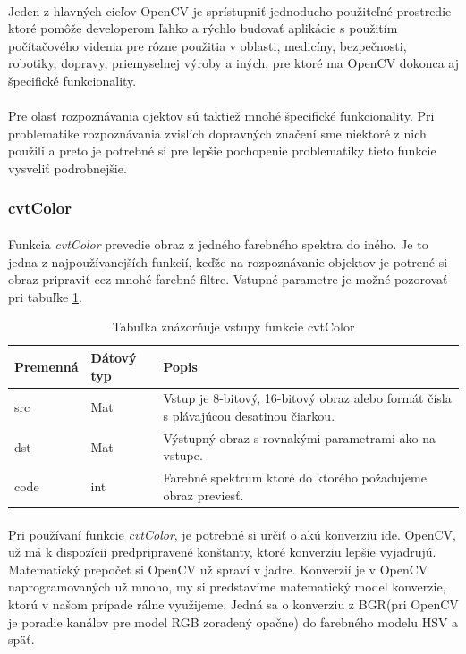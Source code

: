 \documentclass[12pt]{article}
\begin{document}
\paragraph{}
Jeden z hlavných cieľov OpenCV je sprístupniť jednoducho použiteľné prostredie ktoré pomôže developerom ľahko a rýchlo budovať aplikácie s použitím počítačového videnia
pre rôzne použitia v oblasti, medicíny, bezpečnosti, robotiky, dopravy, priemyselnej výroby a iných, pre ktoré ma OpenCV dokonca aj špecifické funkcionality.
\cite{learning_opencv}
\paragraph{}
Pre olasť rozpoznávania ojektov sú taktiež mnohé špecifické funkcionality.
Pri problematike rozpoznávania zvislích dopravných značení sme niektoré z nich použili a preto je potrebné si pre lepšie pochopenie problematiky tieto funkcie vysveliť podrobnejšie.
\subsubsection{cvtColor}
\paragraph{}
Funkcia \emph{cvtColor} prevedie obraz z jedného farebného spektra do iného. Je to jedna z najpoužívanejších funkcií, keďže na rozpoznávanie objektov je potrené si obraz pripraviť
cez mnohé farebné filtre. Vstupné parametre je možné pozorovať pri tabuľke \ref{cvtColorPar}.
\cite{OpenCVDoc}
\begin{table}
	\centering
    \begin{tabular}{ | l | l | p{5cm} |}
    \hline
    Premenná & Dátový typ & Popis \\ \hline
    src & Mat & Vstup je 8-bitový, 16-bitový obraz alebo formát čísla s plávajúcou desatinou čiarkou. \\ \hline
    dst & Mat & Výstupný obraz s rovnakými parametrami ako na vstupe. \\ \hline
    code & int & Farebné spektrum ktoré do ktorého požadujeme obraz previesť. \\
    \hline
    \end{tabular}
  	\caption{Tabuľka znázorňuje vstupy funkcie cvtColor}
  	\label{cvtColorPar}
\end{table}
\paragraph{}
Pri používaní funkcie \emph{cvtColor}, je potrebné si určiť o akú konverziu ide. OpenCV, už má k dispozícii predpripravené konštanty, ktoré konverziu lepšie vyjadrujú.
Matematický prepočet si OpenCV už spraví v jadre. Konverzií je v OpenCV naprogramovaných už mnoho, my si predstavíme matematický model konverzie,
ktorú v našom prípade rálne využijeme. Jedná sa o konverziu z BGR(pri OpenCV je poradie kanálov pre model RGB zoradený opačne) do farebného modelu HSV a späť.
\cite{OpenCVDoc}
\end{document}
